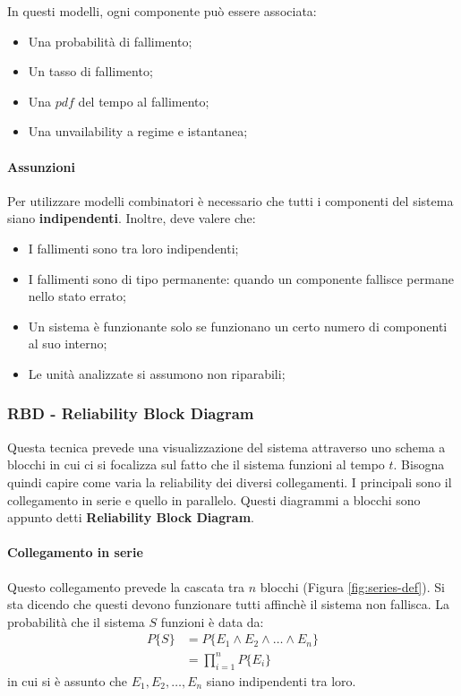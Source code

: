 \documentclass{article}
\begin{document}
In questi modelli, ogni componente può essere associata:
\begin{itemize}
  \item Una probabilità di fallimento;
  \item Un tasso di fallimento;
  \item Una $pdf$ del tempo al fallimento;
  \item Una unvailability a regime e istantanea;
\end{itemize}

\paragraph{Assunzioni}Per utilizzare modelli combinatori è necessario che tutti i componenti
del sistema siano \textbf{indipendenti}. Inoltre, deve valere che:
\begin{itemize}
  \item I fallimenti sono tra loro indipendenti;
  \item I fallimenti sono di tipo permanente: quando un componente fallisce permane nello 
    stato errato;
  \item Un sistema è funzionante solo se funzionano un certo numero di componenti al suo 
    interno;
  \item Le unità analizzate si assumono non riparabili;
\end{itemize}

\subsubsection{RBD - Reliability Block Diagram}
Questa tecnica prevede una visualizzazione del sistema attraverso uno schema a blocchi in 
cui ci si focalizza sul fatto che il sistema funzioni al tempo $t$. Bisogna quindi capire 
come varia la reliability dei diversi collegamenti. I principali sono il collegamento in 
serie e quello in parallelo. Questi diagrammi a blocchi sono appunto detti 
\textbf{Reliability Block Diagram}.

\paragraph{Collegamento in serie}Questo collegamento prevede la cascata tra $n$ blocchi 
(Figura \ref{fig:series-def}). Si sta dicendo che questi devono funzionare tutti affinchè 
il sistema non fallisca. La probabilità che il sistema $S$ funzioni è data da:
\begin{align}
  P\{S\} &= P\{E_1 \land E_2 \land \dots \land E_n\}\\ 
  &= \prod_{i=1}^nP\{E_i\}
\end{align}
in cui si è assunto che $E_1,E_2,\dots,E_n$ siano indipendenti tra loro.
\end{document}
